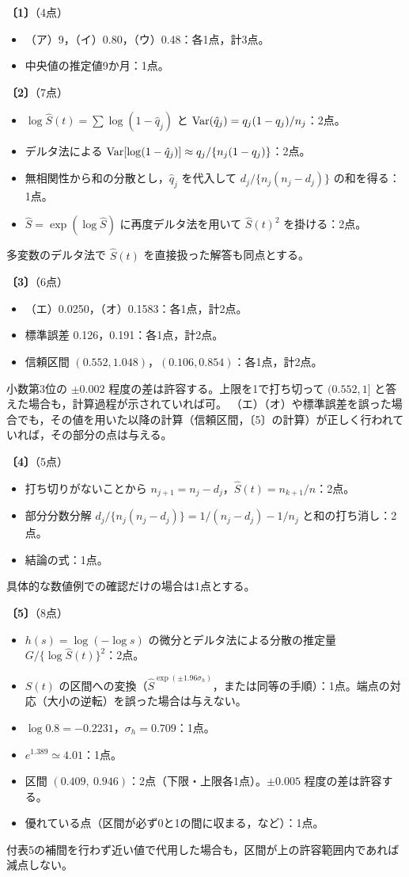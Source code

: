 \documentclass[a4paper,11pt]{ltjsarticle}
\renewcommand{\ans}[1]{\par\medskip\noindent\textbf{〔#1〕}\quad}
\renewcommand{\points}[1]{\hfill\textnormal{（#1点）}\par\nobreak}
\begin{document}
\ans{1}\points{4}
\begin{itemize}
\item （ア）9，（イ）0.80，（ウ）0.48：各1点，計3点。
\item 中央値の推定値9か月：1点。
\end{itemize}

\ans{2}\points{7}
\begin{itemize}
\item $\log\hat S(t)=\sum\log(1-\hat q_j)$ と $\operatorname{Var}(\hat q_j)=q_j(1-q_j)/n_j$：2点。
\item デルタ法による $\operatorname{Var}[\log(1-\hat q_j)]\approx q_j/\{n_j(1-q_j)\}$：2点。
\item 無相関性から和の分散とし，$\hat q_j$ を代入して $d_j/\{n_j(n_j-d_j)\}$ の和を得る：1点。
\item $\hat S=\exp(\log\hat S)$ に再度デルタ法を用いて $\hat S(t)^2$ を掛ける：2点。
\end{itemize}
多変数のデルタ法で $\hat S(t)$ を直接扱った解答も同点とする。

\ans{3}\points{6}
\begin{itemize}
\item （エ）0.0250，（オ）0.1583：各1点，計2点。
\item 標準誤差 0.126，0.191：各1点，計2点。
\item 信頼区間 $(0.552,1.048)$，$(0.106,0.854)$：各1点，計2点。
\end{itemize}
小数第3位の $\pm0.002$ 程度の差は許容する。上限を1で打ち切って $(0.552,1]$ と答えた場合も，計算過程が示されていれば可。
（エ）（オ）や標準誤差を誤った場合でも，その値を用いた以降の計算（信頼区間，〔5〕の計算）が正しく行われていれば，その部分の点は与える。

\ans{4}\points{5}
\begin{itemize}
\item 打ち切りがないことから $n_{j+1}=n_j-d_j$，$\hat S(t)=n_{k+1}/n$：2点。
\item 部分分数分解 $d_j/\{n_j(n_j-d_j)\}=1/(n_j-d_j)-1/n_j$ と和の打ち消し：2点。
\item 結論の式：1点。
\end{itemize}
具体的な数値例での確認だけの場合は1点とする。

\ans{5}\points{8}
\begin{itemize}
\item $h(s)=\log(-\log s)$ の微分とデルタ法による分散の推定量 $G/\{\log\hat S(t)\}^2$：2点。
\item $S(t)$ の区間への変換（$\hat S^{\exp(\pm1.96\sigma_h)}$，または同等の手順）：1点。端点の対応（大小の逆転）を誤った場合は与えない。
\item $\log0.8=-0.2231$，$\sigma_h=0.709$：1点。
\item $e^{1.389}\simeq4.01$：1点。
\item 区間 $(0.409,\ 0.946)$：2点（下限・上限各1点）。$\pm0.005$ 程度の差は許容する。
\item 優れている点（区間が必ず0と1の間に収まる，など）：1点。
\end{itemize}
付表5の補間を行わず近い値で代用した場合も，区間が上の許容範囲内であれば減点しない。
\newpage
\end{document}
